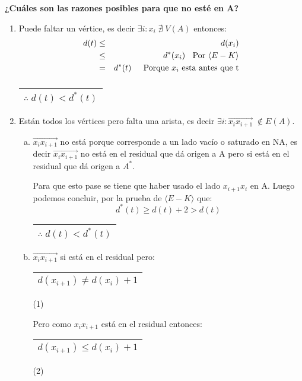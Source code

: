 \documentclass[12pt,a4paper]{report}
\newcounter{neq}
\begin{document}
			\vspace{5mm}
			\textbf{¿Cuáles son las razones posibles para que no esté en A?}
				\begin{enumerate}
					\item Puede faltar un vértice, es decir $\exists i : x_{i} \; \nexists \; V(A)$ entonces:
						\begin{eqnarray}
							\nonumber d(t) &\leq & d(x_{i}) \\
							\nonumber &\leq & d^{*}(x_{i}) \; \; \textup { Por } \langle E-K \rangle \\
							\nonumber &=& d^{*}(t) \; \; \; \; \textup{ Porque } x_{i} \textup{ esta antes que t}
						\end{eqnarray}
						$\qquad\qquad\qquad\qquad\;$
						\begin{tabular}{|c|} \hline $\therefore \; d(t) < d^{*}(t)$ \\\hline \end{tabular}
					\item Están todos los vértices pero falta una arista, es decir $\exists i : \overrightarrow{x_{i}x_{i + 1}} \; \notin E(A)$.
						\begin{enumerate}[a)]
							\item $\overrightarrow{x_{i}x_{i + 1}}$ no está porque corresponde a un lado vacío o saturado en NA, es decir $\overrightarrow{x_{i}x_{i + 1}}$ no está en el residual que dá origen a A pero si está en el residual que dá origen a $A^{*}$.
								\par Para que esto pase se tiene que haber usado el lado $x_{i + 1}x_{i}$ en A. Luego podemos concluir, por la prueba de $\langle E-K\rangle$ que:
								\[ d^{*}(t) \geq d(t) + 2 > d(t) \]
								$\qquad\qquad\qquad\qquad\qquad\qquad$
								\begin{tabular}{|c|} \hline $\therefore \; d(t) < d^{*}(t)$ \\\hline \end{tabular}
							\item $\overrightarrow{x_{i}x_{i + 1}}$ si está en el residual pero:
								\begin{tabular}{|c|} \hline $d(x_{i+1}) \neq d(x_{i}) +1 $ \\ \hline \end{tabular} (1)

								\vspace{5mm}
								\par Pero como $x_{i}x_{i + 1}$ está en el residual entonces:
								\begin{tabular}{|c|} \hline $d(x_{i+1}) \leq d(x_{i}) +1 $ \\ \hline \end{tabular} (2)


\end{enumerate}
\end{enumerate}
\end{document}
